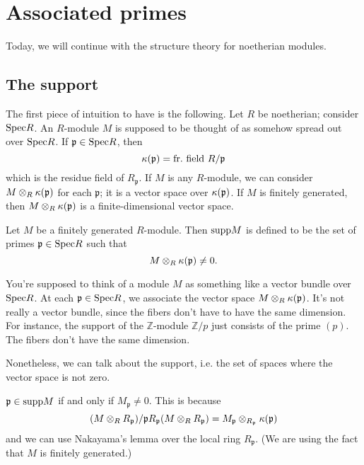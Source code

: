 \section{Associated primes}

Today, we will continue with the structure theory for noetherian modules.

\subsection{The support}
The first piece of intuition to have is the following. Let $R$ be noetherian;
consider $\mathrm{Spec} R$. An $R$-module $M$ is supposed to be thought of as somehow
spread out over $\mathrm{Spec} R$. If $\mathfrak{p} \in \mathrm{Spec} R$, then 
\[ \kappa(\mathfrak{p}) = \mathrm{fr.  \ field \ } R/\mathfrak{p}  \]
which is the residue field of $R_{\mathfrak{p}}$. If $M$ is any $R$-module, we
can consider $M \otimes_R \kappa(\mathfrak{p})$ for each $\mathfrak{p}$; it is a
vector space over $\kappa(\mathfrak{p})$. If $M$ is finitely generated, then $M \otimes_R
\kappa(\mathfrak{p})$ is a finite-dimensional vector space.

\begin{definition} 
Let $M$ be a finitely generated $R$-module. Then $\mathrm{supp} M$ is defined to be the set of primes
$\mathfrak{p} \in \mathrm{Spec} R$ such that
\[ M \otimes_R \kappa(\mathfrak{p}) \neq 0.  \]
\end{definition} 

You're supposed to think of a module $M$ as something like a vector bundle over
$\mathrm{Spec} R$. At each $\mathfrak{p} \in \mathrm{Spec} R$, we associate the vector space $M
\otimes_R \kappa(\mathfrak{p})$. It's not really a vector bundle, since the fibers
don't have to have the same dimension. For instance, the support of the
$\mathbb{Z}$-module $\mathbb{Z}/p$ just consists of the prime $(p)$. The fibers
don't have the same dimension.

Nonetheless, we can talk about the support, i.e. the set of spaces where the
vector space is not zero.

\begin{remark} 
$\mathfrak{p} \in \mathrm{supp} M$ if and only if $M_{\mathfrak{p}} \neq 0$. This is
because
\[ (M \otimes_R R_{\mathfrak{p}})/ \mathfrak{p} R_{\mathfrak{p}} (M \otimes_R
R_{\mathfrak{p}})  = M_{\mathfrak{p}}
\otimes_{R_{\mathfrak{p}}} \kappa(\mathfrak{p})  \]
and we can use Nakayama's lemma over the local ring $R_{\mathfrak{p}}$.  (We
are using the fact that $M$ is finitely generated.)
\end{remark} 

